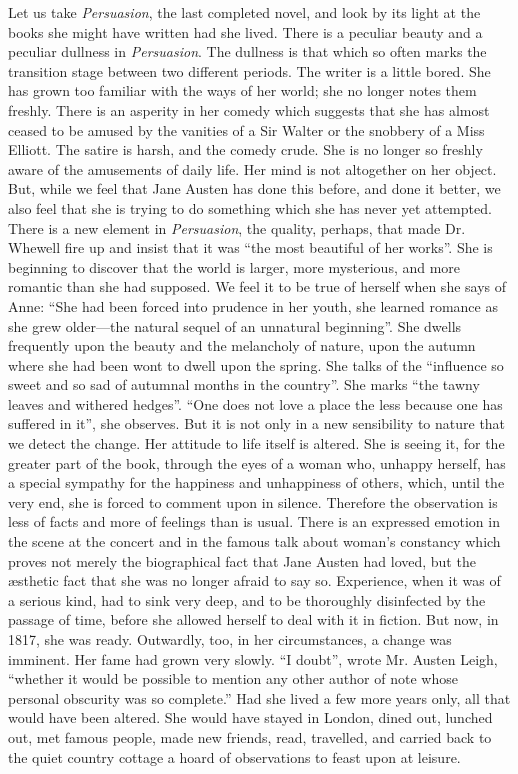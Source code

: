 Let us take \textit{Persuasion}, the last completed novel, and look by its light at the books she might have written had she lived. There is a peculiar beauty and a peculiar dullness in \textit{Persuasion}. The dullness is that which so often marks the transition stage between two different periods. The writer is a little bored. She has grown too familiar with the ways of her world; she no longer notes them freshly. There is an asperity in her comedy which suggests that she has almost ceased to be amused by the vanities of a Sir Walter or the snobbery of a Miss Elliott. The satire is harsh, and the comedy crude. She is no longer so freshly aware of the amusements of daily life. Her mind is not altogether on her object. But, while we feel that Jane Austen has done this before, and done it better, we also feel that she is trying to do something which she has never yet attempted. There is a new element in \textit{Persuasion}, the quality, perhaps, that made Dr. Whewell fire up and insist that it was ``the most beautiful of her works''. She is beginning to discover that the world is larger, more mysterious, and more romantic than she had supposed. We feel it to be true of herself when she says of Anne: ``She had been forced into prudence in her youth, she learned romance as she grew older—the natural sequel of an unnatural beginning''. She dwells frequently upon the beauty and the melancholy of nature, upon the autumn where she had been wont to dwell upon the spring. She talks of the ``influence so sweet and so sad of autumnal months in the country''. She marks ``the tawny leaves and withered hedges''. ``One does not love a place the less because one has suffered in it'', she observes. But it is not only in a new sensibility to nature that we detect the change. Her attitude to life itself is altered. She is seeing it, for the greater part of the book, through the eyes of a woman who, unhappy herself, has a special sympathy for the happiness and unhappiness of others, which, until the very end, she is forced to comment upon in silence. Therefore the observation is less of facts and more of feelings than is usual. There is an expressed emotion in the scene at the concert and in the famous talk about woman's constancy which proves not merely the biographical fact that Jane Austen had loved, but the æsthetic fact that she was no longer afraid to say so. Experience, when it was of a serious kind, had to sink very deep, and to be thoroughly disinfected by the passage of time, before she allowed herself to deal with it in fiction. But now, in 1817, she was ready. Outwardly, too, in her circumstances, a change was imminent. Her fame had grown very slowly. ``I doubt'', wrote Mr. Austen Leigh, ``whether it would be possible to mention any other author of note whose personal obscurity was so complete.'' Had she lived a few more years only, all that would have been altered. She would have stayed in London, dined out, lunched out, met famous people, made new friends, read, travelled, and carried back to the quiet country cottage a hoard of observations to feast upon at leisure.

